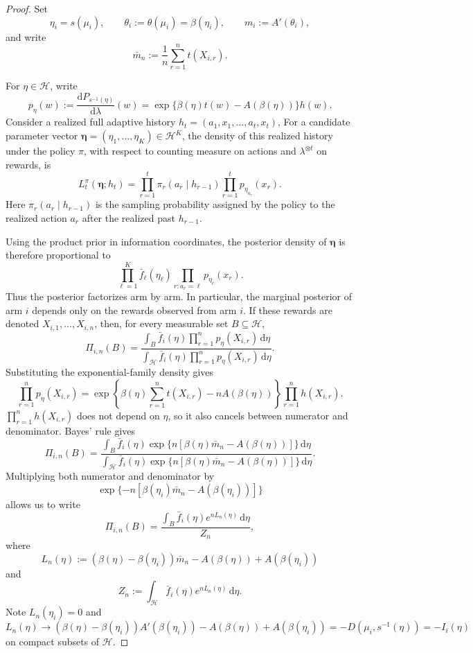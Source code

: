 \documentclass[10pt,a4paper]{amsart}
\newcommand{\dd}{\mathrm{d}}
\begin{document}
\begin{proof}
Set
\[
    \eta_i=s(\mu_i),
    \qquad
    \theta_i:=\theta(\mu_i)=\beta(\eta_i),
    \qquad
    m_i:=A'(\theta_i),
\]
and write
\[
    \bar m_n:=\frac1n\sum_{r=1}^nt(X_{i,r}).
\]

For \(\eta\in\mathcal H\), write
\[
    p_\eta(w)
    :=
    \frac{\dd P_{s^{-1}(\eta)}}{\dd\lambda}(w)
    =
    \exp\{\beta(\eta)t(w)-A(\beta(\eta))\}h(w).
\]
Consider a realized full adaptive history $h_t=(a_1,x_1,\ldots,a_t,x_t)$,
For a candidate parameter vector
$\boldsymbol\eta=(\eta_1,\ldots,\eta_K)\in\mathcal H^K$,
the density of this realized history under the policy \(\pi\), with respect to
counting measure on actions and \(\lambda^{\otimes t}\) on rewards, is
\[
    L_t^\pi(\boldsymbol\eta;h_t)
    =
    \prod_{r=1}^t
    \pi_r(a_r\mid h_{r-1})
    \prod_{r=1}^t
    p_{\eta_{a_r}}(x_r).
\]
Here \(\pi_r(a_r\mid h_{r-1})\) is the sampling probability assigned by the
policy to the realized action \(a_r\) after the realized past \(h_{r-1}\).

Using the product prior in information coordinates, the posterior density of
\(\boldsymbol\eta\) is therefore proportional to
\[
    \prod_{\ell=1}^K
    \bar f_\ell(\eta_\ell)
    \prod_{r:a_r=\ell}
    p_{\eta_\ell}(x_r).
\]
Thus the posterior factorizes arm by arm.  In particular, the marginal posterior
of arm \(i\) depends only on the rewards observed from arm \(i\).  If these
rewards are denoted
$X_{i,1},\ldots,X_{i,n}$,
then, for every measurable set \(B\subseteq\mathcal H\),
\[
    \varPi_{i,n}(B)
    =
    \frac{
        \int_B
        \bar f_i(\eta)
        \prod_{r=1}^n p_\eta(X_{i,r})
        \,\dd\eta
    }{
        \int_{\mathcal H}
        \bar f_i(\eta)
        \prod_{r=1}^n p_\eta(X_{i,r})
        \,\dd\eta
    }.
\]
Substituting the exponential-family density gives
\[
    \prod_{r=1}^n p_\eta(X_{i,r})
    =
    \exp\left\{
        \beta(\eta)\sum_{r=1}^nt(X_{i,r})
        -
        nA(\beta(\eta))
    \right\}
    \prod_{r=1}^n h(X_{i,r}).
\]
\(\prod_{r=1}^n h(X_{i,r})\) does not depend on \(\eta\), so
it also cancels between numerator and denominator.
Bayes' rule gives
\[
    \varPi_{i,n}(B)
    =
    \frac{
        \int_B
        \bar f_i(\eta)
        \exp\{n[\beta(\eta)\bar m_n-A(\beta(\eta))]\}
        \,\dd\eta
    }{
        \int_{\mathcal H}
        \bar f_i(\eta)
        \exp\{n[\beta(\eta)\bar m_n-A(\beta(\eta))]\}
        \,\dd\eta
    }.
\]
Multiplying both numerator and denominator by
\[
    \exp\{-n[\beta(\eta_i)\bar m_n-A(\beta(\eta_i))]\}
\]
allows us to write
\[
    \varPi_{i,n}(B)
    =
    \frac{
        \int_B \bar f_i(\eta)e^{nL_n(\eta)}\,\dd\eta
    }{
        Z_n
    },
\]
where
\[
    L_n(\eta)
    :=
    (\beta(\eta)-\beta(\eta_i))\bar m_n
    -
    A(\beta(\eta))
    +
    A(\beta(\eta_i))
\]
and
\[
    Z_n
    :=
    \int_{\mathcal H}\bar f_i(\eta)e^{nL_n(\eta)}\,\dd\eta.
\]
Note \(L_n(\eta_i)=0\) and
\[
    L_n(\eta)\to (\beta(\eta)-\beta(\eta_i))A'(\beta(\eta_i)) - A(\beta(\eta))+A(\beta(\eta_i))
    = -D(\mu_i,s^{-1}(\eta))=-I_i(\eta)
\]
on compact subsets of \(\mathcal H\).




\end{proof}
\end{document}
